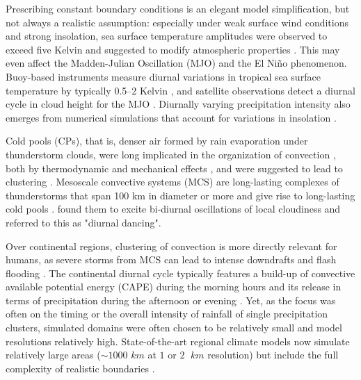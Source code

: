 \documentclass[draft,linenumbers]{agujournal2019}
\begin{document}
Prescribing constant boundary conditions is an elegant model simplification, but not always a realistic assumption: 
especially under weak surface wind conditions and strong insolation, sea surface temperature amplitudes were observed to exceed five Kelvin and suggested to modify atmospheric properties \cite{kawai2007diurnal}. 
This may even affect the Madden-Julian Oscillation (MJO) and the El Ni\~no phenomenon.
Buoy-based instruments measure diurnal variations in tropical sea surface temperature by typically 0.5--2 Kelvin \cite{weller1996surface,johnson1999trimodal}, and satellite observations detect a diurnal cycle in cloud height for the MJO \cite{suzuki2009diurnal,tian2006modulation}.
Diurnally varying precipitation intensity also emerges from numerical simulations that account for variations in insolation \cite{liu1998numerical}. 

Cold pools (CPs), that is, denser air formed by rain evaporation under thunderstorm clouds, were long implicated in the organization of convection \cite{Drogemeier1985,rotunno1988theory}, both by thermodynamic and mechanical effects \cite{tompkins2001organizationCold,schlemmer2015modifications,boing2012influence,boing2016object,feng2015mechanisms,moseley2016intensification}, and were suggested to lead to clustering \cite{haerter2018reconciling,lochbihler2019response}.
Mesoscale convective systems (MCS) are long-lasting complexes of thunderstorms that span 100 km in diameter or more and give rise to long-lasting cold pools \cite{moeng1995atmospheric}. 
\citeauthor{chen1997diurnal} \citeyear{chen1997diurnal} found them to excite bi-diurnal oscillations of local cloudiness and referred to this as "diurnal dancing".

Over continental regions, clustering of convection is more directly relevant for humans, as severe storms from MCS can lead to intense downdrafts and flash flooding
\cite{doswell2001severe,smith2001extreme,cintineo2013predictability}.
The continental diurnal cycle typically features a build-up of convective available potential energy (CAPE) during the morning hours and its release in terms of precipitation during the afternoon or evening \cite{yang2001diurnal,guichard2004modelling,brown2002large,petch2002impact,schlemmer2011diurnal,moseley2016intensification,haerter2018intensified}.
Yet, as the focus was often on the timing or the overall intensity of rainfall of single precipitation clusters, simulated domains were often chosen to be relatively small and model resolutions relatively high. 
State-of-the-art regional climate models now simulate relatively large areas ($\sim 1000$ $km$ at $1$ or $2$ $\;km$ resolution) but include the full complexity of realistic boundaries \cite{ban2015heavy,prein2017simulating,rasp2018variability}.
\end{document}
